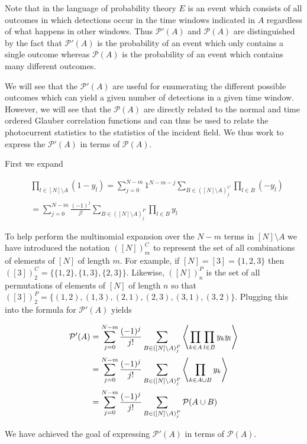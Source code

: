 \documentclass[12pt]{article}
\begin{document}
Note that in the language of probability theory $E$ is an event which consists of all outcomes in which detections occur in the time windows indicated in $A$ regardless of what happens in other windows. Thus $\mathcal{P}'(A)$ and $\mathcal{P}(A)$ are distinguished by the fact that $\mathcal{P}'(A)$ is the probability of an event which only contains a single outcome whereas $\mathcal{P}(A)$ is the probability of an event which contains many different outcomes.

We will see that the $\mathcal{P}'(A)$ are useful for enumerating the different possible outcomes which can yield a given number of detections in a given time window. However, we will see that the $\mathcal{P}(A)$ are directly related to the normal and time ordered Glauber correlation functions and can thus be used to relate the photocurrent statistics to the statistics of the incident field.
We thus work to express the $\mathcal{P}'(A)$ in terms of $\mathcal{P}(A)$.

First we expand 

\begin{align}
&\prod_{l \in [N] \setminus A}(1-y_l) = \sum_{j=0}^{N-m} 1^{N-m-j}\sum_{B \in ([N]\setminus A)^C_j} \prod_{l\in B}(-y_l)\\
&= \sum_{j=0}^{N-m}\frac{(-1)^j}{j!} \sum_{B\in([N]\setminus A)^P_j}\prod_{l \in B} y_l
\end{align}

To help perform the multinomial expansion over the $N-m$ terms in $[N]\setminus A$ we have introduced the notation $([N])_m^C$ to represent the set of all combinations of elements of $[N]$ of length $m$. For example, if $[N] = [3] = \{1,2,3\}$ then $([3])_2^C = \{\{1,2\},\{1,3\},\{2,3\} \}$. Likewise, $([N])_n^P$ is the set of all permutations of elements of $[N]$ of length $n$ so that $([3])_2^P = \{(1,2),(1,3),(2,1),(2,3),(3,1),(3,2) \}$. Plugging this into the formula for $\mathcal{P}'(A)$ yields

\begin{align}
\mathcal{P}'(A) &= \sum_{j=0}^{N-m} \frac{(-1)^j}{j!} \sum_{B \in ([N] \setminus A)_j^P} \Braket{\prod_{k\in A } \prod_{l \in B}  y_k y_l}\\
&= \sum_{j=0}^{N-m} \frac{(-1)^j}{j!} \sum_{B \in ([N] \setminus A)_j^P} \Braket{\prod_{k \in A \cup B} y_k}\\
&=\sum_{j=0}^{N-m} \frac{(-1)^j}{j!} \sum_{B \in ([N] \setminus A)_j^P} \mathcal{P}(A \cup B)
\end{align}

We have achieved the goal of expressing $\mathcal{P}'(A)$ in terms of $\mathcal{P}(A)$.
\end{document}
